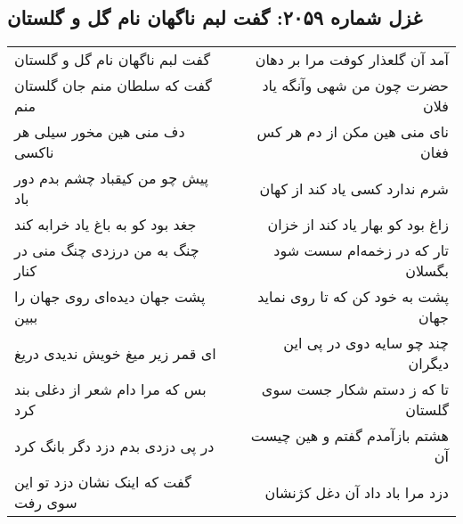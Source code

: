 \begin{center}
\section*{غزل شماره ۲۰۵۹: گفت لبم ناگهان نام گل و گلستان}
\label{sec:2059}
\begin{longtable}{l p{0.5cm} r}
گفت لبم ناگهان نام گل و گلستان
&&
آمد آن گلعذار کوفت مرا بر دهان
\\
گفت که سلطان منم جان گلستان منم
&&
حضرت چون من شهی وآنگه یاد فلان
\\
دف منی هین مخور سیلی هر ناکسی
&&
نای منی هین مکن از دم هر کس فغان
\\
پیش چو من کیقباد چشم بدم دور باد
&&
شرم ندارد کسی یاد کند از کهان
\\
جغد بود کو به باغ یاد خرابه کند
&&
زاغ بود کو بهار یاد کند از خزان
\\
چنگ به من درزدی چنگ منی در کنار
&&
تار که در زخمه‌ام سست شود بگسلان
\\
پشت جهان دیده‌ای روی جهان را ببین
&&
پشت به خود کن که تا روی نماید جهان
\\
ای قمر زیر میغ خویش ندیدی دریغ
&&
چند چو سایه دوی در پی این دیگران
\\
بس که مرا دام شعر از دغلی بند کرد
&&
تا که ز دستم شکار جست سوی گلستان
\\
در پی دزدی بدم دزد دگر بانگ کرد
&&
هشتم بازآمدم گفتم و هین چیست آن
\\
گفت که اینک نشان دزد تو این سوی رفت
&&
دزد مرا باد داد آن دغل کژنشان
\\
\end{longtable}
\end{center}
